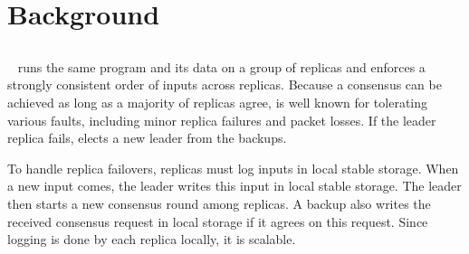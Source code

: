 \section{Background}\label{sec:background}


\subsection{\paxos}\label{sec:paxos}
\paxos~\cite{paxos:complex,paxos,paxos:simple,paxos:live,paxos:fast,
paxos:practical} runs the same program and its data on a group of replicas 
and enforces a strongly consistent order of inputs across replicas. Because 
a consensus can be achieved as long as a majority of replicas agree, \paxos is 
well known for tolerating various faults, including minor replica failures 
and packet losses. If the leader replica fails, \paxos elects a new leader from 
the backups.

To handle replica failovers, \paxos replicas must log inputs in local stable 
storage. When a new input comes, the \paxos leader writes this input in 
local stable storage. The leader then starts a new consensus round among 
replicas. A backup also writes the received consensus request in local storage 
if it agrees on this request. Since logging is done by each replica locally, it 
is scalable.



